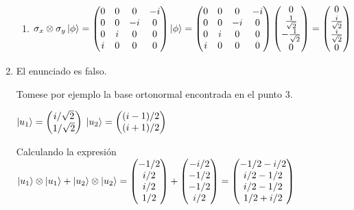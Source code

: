 \documentclass[letter,twoside,12pt]{article}
\begin{document}
\begin{enumerate}
\begin{enumerate}
\item $ \sigma_x \otimes \sigma_y \ket{\phi} = \begin{pmatrix}
0 & 0 & 0 & -i 
\\ 0 & 0 & -i & 0
\\ 0 & i & 0 & 0
\\ i & 0 & 0 & 0
\end{pmatrix} \ket{\phi}=
\begin{pmatrix}
0 & 0 & 0 & -i 
\\ 0 & 0 & -i & 0
\\ 0 & i & 0 & 0
\\ i & 0 & 0 & 0
\end{pmatrix} \begin{pmatrix} 0 \\ \frac{1}{\sqrt{2}} \\ -\frac{1}{\sqrt{2}} \\ 0\end{pmatrix} = 
\begin{pmatrix} 0 \\ \frac{i}{\sqrt{2}} \\ \frac{i}{\sqrt{2}} \\ 0\end{pmatrix}$ 
\end{enumerate}
\item El enunciado es falso.

Tomese por ejemplo la base ortonormal encontrada en el punto 3.

$ \ket{u_1} = \begin{pmatrix}
i/\sqrt{2}
\\ 1/\sqrt{2}
\end{pmatrix} $ 
 $ \ket{u_2} = \begin{pmatrix}
 (i-1)/2
 \\ (i+1)/2
 \end{pmatrix}$ 

Calculando la expresión $ \ket{u_1} \otimes \ket{u_1} + \ket{u_2} \otimes \ket{u_2} = \begin{pmatrix} -1/2 \\ i/2 \\ i/2 \\ 1/2 \end{pmatrix} + \begin{pmatrix} -i/2 \\ -1/2 \\ -1/2 \\ i/2 \end{pmatrix} = \begin{pmatrix} -1/2-i/2 \\ i/2-1/2 \\ i/2-1/2 \\ 1/2+i/2 \end{pmatrix} $


\end{enumerate}
\end{document}
